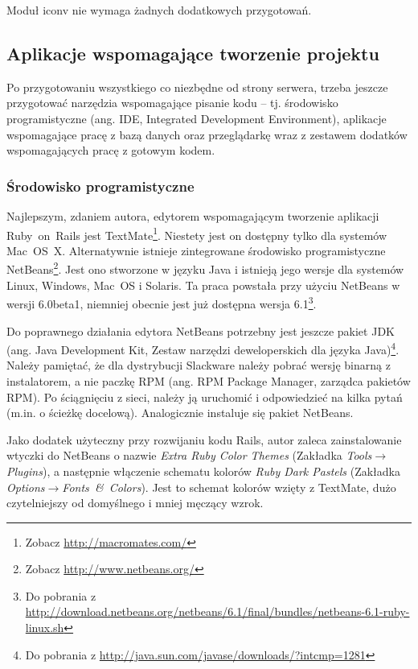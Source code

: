 \documentclass[a4paper,12pt,oneside]{report}
\begin{document}
Moduł iconv nie wymaga żadnych dodatkowych przygotowań.

\subsection{Aplikacje wspomagające tworzenie projektu}
\label{sub:ide}
Po przygotowaniu wszystkiego co niezbędne od strony serwera, trzeba jeszcze przygotować narzędzia wspomagające pisanie kodu -- tj. środowisko programistyczne (ang. IDE, Integrated Development Environment), aplikacje wspomagające pracę z bazą danych oraz przeglądarkę wraz z zestawem dodatków wspomagających pracę z gotowym kodem.

\subsubsection{Środowisko programistyczne}
\label{subsub:ide}
Najlepszym, zdaniem autora, edytorem wspomagającym tworzenie aplikacji Ruby~on~Rails jest TextMate\footnote{Zobacz \url{http://macromates.com/}}. Niestety jest on dostępny tylko dla systemów Mac~OS~X. Alternatywnie istnieje zintegrowane środowisko programistyczne NetBeans\footnote{Zobacz \url{http://www.netbeans.org/}}. Jest ono stworzone w języku Java i istnieją jego wersje dla systemów Linux, Windows, Mac~OS i Solaris. Ta praca powstała przy użyciu NetBeans w wersji 6.0beta1, niemniej obecnie jest już dostępna wersja 6.1\footnote{Do pobrania z \url{http://download.netbeans.org/netbeans/6.1/final/bundles/netbeans-6.1-ruby-linux.sh}}.

Do poprawnego działania edytora NetBeans potrzebny jest jeszcze pakiet JDK (ang. Java Development Kit, Zestaw narzędzi deweloperskich dla języka Java)\footnote{Do pobrania z \url{http://java.sun.com/javase/downloads/?intcmp=1281}}. Należy pamiętać, że dla dystrybucji Slackware należy pobrać wersję binarną z instalatorem, a nie paczkę RPM (ang. RPM Package Manager, zarządca pakietów RPM). Po ściągnięciu z sieci, należy ją uruchomić i odpowiedzieć na kilka pytań (m.in. o ścieżkę docelową). Analogicznie instaluje się pakiet NetBeans.

Jako dodatek użyteczny przy rozwijaniu kodu Rails, autor zaleca zainstalowanie wtyczki do NetBeans o nazwie \emph{Extra Ruby Color Themes} (Zakładka \emph{Tools}$\to$\emph{Plugins}), a następnie włączenie schematu kolorów \emph{Ruby Dark Pastels} (Zakładka \emph{Options}$\to$\emph{Fonts~\&~Colors}). Jest to schemat kolorów wzięty z TextMate, dużo czytelniejszy od domyślnego i mniej męczący wzrok.
\end{document}
